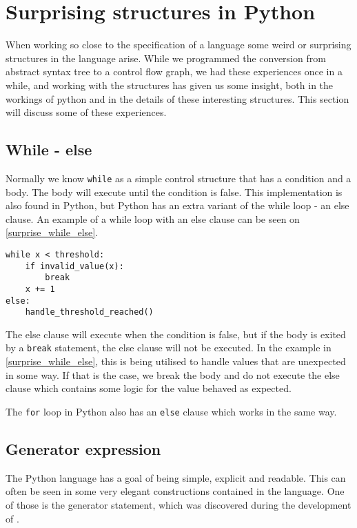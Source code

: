 \section{Surprising structures in Python}
When working so close to the specification of a language some weird or surprising structures in the language arise.
While we programmed the conversion from abstract syntax tree to a control flow graph, we had these experiences once in a while, and working with the structures has given us some insight, both in the workings of python and in the details of these interesting structures.
This section will discuss some of these experiences.

\subsection{While - else}
Normally we know \texttt{while} as a simple control structure that has a condition and a body.
The body will execute until the condition is false.
This implementation is also found in Python, but Python has an extra variant of the while loop - an else clause.
An example of a while loop with an else clause can be seen on \cref{surprise_while_else}.

\begin{lstlisting}[style=python, caption={A while loop with an else clause}, label={surprise_while_else}]
while x < threshold:
    if invalid_value(x):
        break
    x += 1
else:
    handle_threshold_reached()
\end{lstlisting}

The else clause will execute when the condition is false, but if the body is exited by a \texttt{break} statement, the else clause will not be executed.
In the example in \cref{surprise_while_else}, this is being utilised to handle values that are unexpected in some way.
If that is the case, we break the body and do not execute the else clause which contains some logic for the value behaved as expected.

The \texttt{for} loop in Python also has an \texttt{else} clause which works in the same way.

\subsection{Generator expression}
The Python language has a goal of being simple, explicit and readable\citep{python_zen}.
This can often be seen in some very elegant constructions contained in the language.
One of those is the generator statement, which was discovered during the development of \pyt{}.

